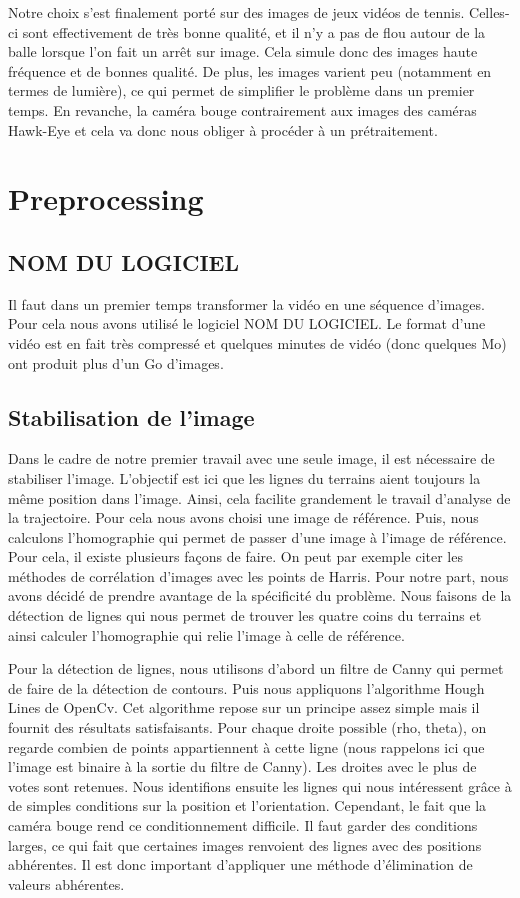 \documentclass[a4paper]{article}
\begin{document}
Notre choix s'est finalement porté sur des images de jeux vidéos de tennis. Celles-ci sont effectivement de très bonne qualité, et il n'y a pas de flou autour de la balle lorsque l'on fait un arrêt sur image. Cela simule donc des images haute fréquence et de bonnes qualité. De plus, les images varient peu (notamment en termes de lumière), ce qui permet de simplifier le problème dans un premier temps. En revanche, la caméra bouge contrairement aux images des caméras Hawk-Eye et cela va donc nous obliger à procéder à un prétraitement.

\section{Preprocessing}
\subsection{NOM DU LOGICIEL}
Il faut dans un premier temps transformer la vidéo en une séquence d'images. Pour cela nous avons utilisé le logiciel NOM DU LOGICIEL. Le format d'une vidéo est en fait très compressé et quelques minutes de vidéo (donc quelques Mo) ont produit plus d'un Go d'images.

\subsection{Stabilisation de l'image}
Dans le cadre de notre premier travail avec une seule image, il est nécessaire de stabiliser l'image. L'objectif est ici que les lignes du terrains aient toujours la même position dans l'image. Ainsi, cela facilite grandement le travail d'analyse de la trajectoire. Pour cela nous avons choisi une image de référence. Puis, nous calculons l'homographie qui permet de passer d'une image à l'image de référence. Pour cela, il existe plusieurs façons de faire. On peut par exemple citer les méthodes de corrélation d'images avec les points de Harris. Pour notre part, nous avons décidé de prendre avantage de la spécificité du problème. Nous faisons de la détection de lignes qui nous permet de trouver les quatre coins du terrains et ainsi calculer l'homographie qui relie l'image à celle de référence.

Pour la détection de lignes, nous utilisons d'abord un filtre de Canny qui permet de faire de la détection de contours. Puis nous appliquons l'algorithme Hough Lines de OpenCv. Cet algorithme repose sur un principe assez simple mais il fournit des résultats satisfaisants. Pour chaque droite possible (rho, theta), on regarde combien de points appartiennent à cette ligne (nous rappelons ici que l'image est binaire à la sortie du filtre de Canny). Les droites avec le plus de votes sont retenues. Nous identifions ensuite les lignes qui nous intéressent grâce à de simples conditions sur la position et l'orientation. Cependant, le fait que la caméra bouge rend ce conditionnement difficile. Il faut garder des conditions larges, ce qui fait que certaines images renvoient des lignes avec des positions abhérentes. Il est donc important d'appliquer une méthode d'élimination de valeurs abhérentes.
\end{document}
